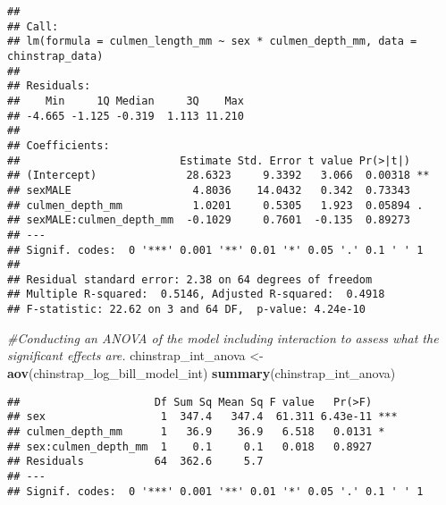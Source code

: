 \documentclass[
]{article}
\newenvironment{Shaded}{\begin{snugshade}}{\end{snugshade}}
\newcommand{\CommentTok}[1]{\textcolor[rgb]{0.56,0.35,0.01}{\textit{#1}}}
\newcommand{\FunctionTok}[1]{\textcolor[rgb]{0.13,0.29,0.53}{\textbf{#1}}}
\newcommand{\NormalTok}[1]{#1}
\newcommand{\OtherTok}[1]{\textcolor[rgb]{0.56,0.35,0.01}{#1}}
\begin{document}
\begin{verbatim}
## 
## Call:
## lm(formula = culmen_length_mm ~ sex * culmen_depth_mm, data = chinstrap_data)
## 
## Residuals:
##    Min     1Q Median     3Q    Max 
## -4.665 -1.125 -0.319  1.113 11.210 
## 
## Coefficients:
##                         Estimate Std. Error t value Pr(>|t|)   
## (Intercept)              28.6323     9.3392   3.066  0.00318 **
## sexMALE                   4.8036    14.0432   0.342  0.73343   
## culmen_depth_mm           1.0201     0.5305   1.923  0.05894 . 
## sexMALE:culmen_depth_mm  -0.1029     0.7601  -0.135  0.89273   
## ---
## Signif. codes:  0 '***' 0.001 '**' 0.01 '*' 0.05 '.' 0.1 ' ' 1
## 
## Residual standard error: 2.38 on 64 degrees of freedom
## Multiple R-squared:  0.5146, Adjusted R-squared:  0.4918 
## F-statistic: 22.62 on 3 and 64 DF,  p-value: 4.24e-10
\end{verbatim}

\begin{Shaded}
\begin{Highlighting}[]
\CommentTok{\#Conducting an ANOVA of the model including interaction to assess what the significant effects are.}
\NormalTok{chinstrap\_int\_anova }\OtherTok{\textless{}{-}} \FunctionTok{aov}\NormalTok{(chinstrap\_log\_bill\_model\_int)}
\FunctionTok{summary}\NormalTok{(chinstrap\_int\_anova)}
\end{Highlighting}
\end{Shaded}

\begin{verbatim}
##                     Df Sum Sq Mean Sq F value   Pr(>F)    
## sex                  1  347.4   347.4  61.311 6.43e-11 ***
## culmen_depth_mm      1   36.9    36.9   6.518   0.0131 *  
## sex:culmen_depth_mm  1    0.1     0.1   0.018   0.8927    
## Residuals           64  362.6     5.7                     
## ---
## Signif. codes:  0 '***' 0.001 '**' 0.01 '*' 0.05 '.' 0.1 ' ' 1
\end{verbatim}
\end{document}
